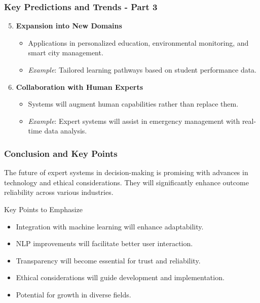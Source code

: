 \documentclass[aspectratio=169]{beamer}
\begin{document}
\begin{frame}[fragile]
    \frametitle{Key Predictions and Trends - Part 3}
    \begin{enumerate}
        \setcounter{enumi}{4}
        \item \textbf{Expansion into New Domains}
        \begin{itemize}
            \item Applications in personalized education, environmental monitoring, and smart city management.
            \item \textit{Example}: Tailored learning pathways based on student performance data.
        \end{itemize}
        
        \item \textbf{Collaboration with Human Experts}
        \begin{itemize}
            \item Systems will augment human capabilities rather than replace them.
            \item \textit{Example}: Expert systems will assist in emergency management with real-time data analysis.
        \end{itemize}
    \end{enumerate}
\end{frame}

\begin{frame}[fragile]
    \frametitle{Conclusion and Key Points}
    The future of expert systems in decision-making is promising with advances in technology and ethical considerations. They will significantly enhance outcome reliability across various industries.
    
    \begin{block}{Key Points to Emphasize}
        \begin{itemize}
            \item Integration with machine learning will enhance adaptability.
            \item NLP improvements will facilitate better user interaction.
            \item Transparency will become essential for trust and reliability.
            \item Ethical considerations will guide development and implementation.
            \item Potential for growth in diverse fields.
        \end{itemize}
    \end{block}
\end{frame}
\end{document}
